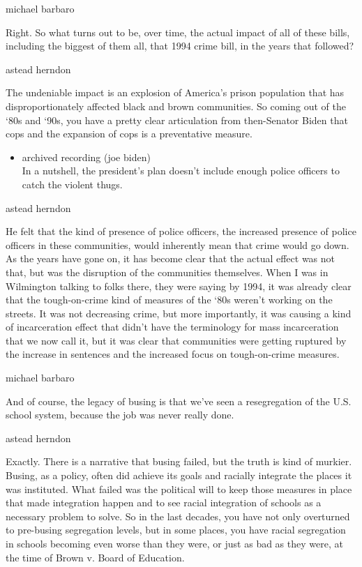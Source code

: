 michael barbaro

Right. So what turns out to be, over time, the actual impact of all of
these bills, including the biggest of them all, that 1994 crime bill, in
the years that followed?

astead herndon

The undeniable impact is an explosion of America's prison population
that has disproportionately affected black and brown communities. So
coming out of the `80s and `90s, you have a pretty clear articulation
from then-Senator Biden that cops and the expansion of cops is a
preventative measure.

\begin{itemize}
\tightlist
\item
  archived recording (joe biden)\\
  In a nutshell, the president's plan doesn't include enough police
  officers to catch the violent thugs.
\end{itemize}

astead herndon

He felt that the kind of presence of police officers, the increased
presence of police officers in these communities, would inherently mean
that crime would go down. As the years have gone on, it has become clear
that the actual effect was not that, but was the disruption of the
communities themselves. When I was in Wilmington talking to folks there,
they were saying by 1994, it was already clear that the tough-on-crime
kind of measures of the `80s weren't working on the streets. It was not
decreasing crime, but more importantly, it was causing a kind of
incarceration effect that didn't have the terminology for mass
incarceration that we now call it, but it was clear that communities
were getting ruptured by the increase in sentences and the increased
focus on tough-on-crime measures.

michael barbaro

And of course, the legacy of busing is that we've seen a resegregation
of the U.S. school system, because the job was never really done.

astead herndon

Exactly. There is a narrative that busing failed, but the truth is kind
of murkier. Busing, as a policy, often did achieve its goals and
racially integrate the places it was instituted. What failed was the
political will to keep those measures in place that made integration
happen and to see racial integration of schools as a necessary problem
to solve. So in the last decades, you have not only overturned to
pre-busing segregation levels, but in some places, you have racial
segregation in schools becoming even worse than they were, or just as
bad as they were, at the time of Brown v. Board of Education.

